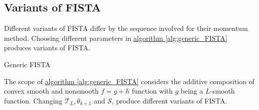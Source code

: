 \documentclass[]{article}
\theoremstyle{definition}
\numberwithin{equation}{subsection}
\begin{document}
    \subsection*{Variants of FISTA}
        Different variants of FISTA differ by the sequence involved for their momentum method. 
        Choosing different parameters in \hyperref[alg:generic_FISTA]{algorithm \ref*{alg:generic_FISTA}} produces variants of FISTA. 
        \begin{algorithm}[H]
            \begin{algorithmic}[1]
                \ENDFOR
            \end{algorithmic}
            \caption{Generic FISTA}
            \label{alg:generic_FISTA}
        \end{algorithm}
        The scope of \hyperref[alg:generic_FISTA]{algorithm \ref*{alg:generic_FISTA}} considers the additive composition of convex smooth and nonsmooth $f = g + h$ function with $g$ being a $L$-smooth function. 
        Changing $\mathcal T_L, \theta_{k + 1}$ and $\mathcal S$, produce different variants of FISTA. 
\end{document}
